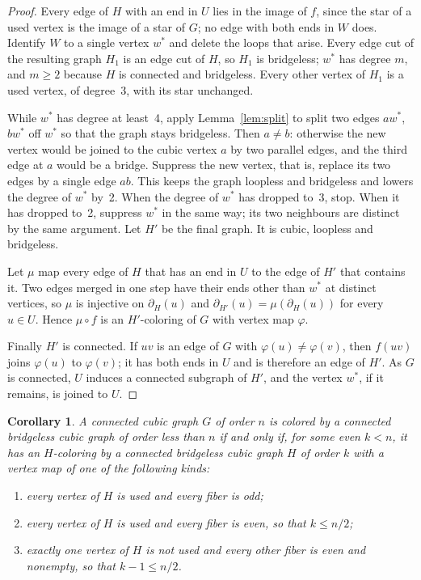 \documentclass[11pt]{article}
\newtheorem{corollary}[theorem]{Corollary}
\theoremstyle{definition}
\theoremstyle{remark}
\begin{document}
\begin{proof}
Every edge of $H$ with an end in $U$ lies in the image of $f$, since the star of a used vertex is
the image of a star of $G$; no edge with both ends in $W$ does. Identify $W$ to a single vertex
$w^*$ and delete the loops that arise. Every edge cut of the resulting graph $H_1$ is an edge cut
of $H$, so $H_1$ is bridgeless; $w^*$ has degree $m$, and $m \ge 2$ because $H$ is connected and
bridgeless. Every other vertex of $H_1$ is a used vertex, of degree~3, with its star unchanged.

While $w^*$ has degree at least~4, apply Lemma~\ref{lem:split} to split two edges $aw^*$, $bw^*$
off $w^*$ so that the graph stays bridgeless. Then $a \ne b$: otherwise the new vertex would be
joined to the cubic vertex $a$ by two parallel edges, and the third edge at $a$ would be a bridge.
Suppress the new vertex, that is, replace its two edges by a single edge $ab$. This keeps the graph
loopless and bridgeless and lowers the degree of $w^*$ by~2. When the degree of $w^*$ has dropped
to~3, stop. When it has dropped to~2, suppress $w^*$ in the same way; its two neighbours are
distinct by the same argument. Let $H'$ be the final graph. It is cubic, loopless and bridgeless.

Let $\mu$ map every edge of $H$ that has an end in $U$ to the edge of $H'$ that contains it. Two
edges merged in one step have their ends other than $w^*$ at distinct vertices, so $\mu$ is
injective on $\partial_H(u)$ and $\partial_{H'}(u) = \mu(\partial_H(u))$ for every $u \in U$. Hence
$\mu \circ f$ is an $H'$-coloring of $G$ with vertex map $\varphi$.

Finally $H'$ is connected. If $uv$ is an edge of $G$ with $\varphi(u) \ne \varphi(v)$, then
$f(uv)$ joins $\varphi(u)$ to $\varphi(v)$; it has both ends in $U$ and is therefore an edge of
$H'$. As $G$ is connected, $U$ induces a connected subgraph of $H'$, and the vertex $w^*$, if it
remains, is joined to $U$.
\end{proof}

\begin{corollary}\label{cor:modes}
A connected cubic graph $G$ of order $n$ is colored by a connected bridgeless cubic graph of order
less than $n$ if and only if, for some even $k < n$, it has an $H$-coloring by a connected
bridgeless cubic graph $H$ of order $k$ with a vertex map of one of the following kinds:
\begin{enumerate}
\item[\textup{(O)}] every vertex of $H$ is used and every fiber is odd;
\item[\textup{(E0)}] every vertex of $H$ is used and every fiber is even, so that $k \le n/2$;
\item[\textup{(E1)}] exactly one vertex of $H$ is not used and every other fiber is even and
nonempty, so that $k - 1 \le n/2$.
\end{enumerate}
\end{corollary}
\end{document}
